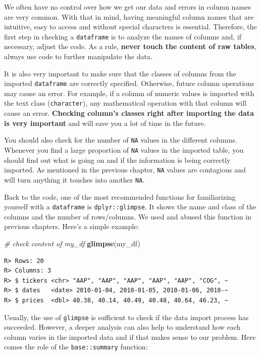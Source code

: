 \documentclass[
  12pt,
]{book}
\newenvironment{Shaded}{\begin{snugshade}}{\end{snugshade}}
\newcommand{\CommentTok}[1]{\textcolor[rgb]{0.37,0.37,0.37}{\textit{#1}}}
\newcommand{\KeywordTok}[1]{\textcolor[rgb]{0.27,0.27,0.27}{\textbf{#1}}}
\newcommand{\NormalTok}[1]{#1}
\begin{document}
We often have no control over how we get our data and errors in column names are very common. With that in mind, having meaningful column names that are intuitive, easy to access and without special characters is essential. Therefore, the first step in checking a \texttt{dataframe} is to analyze the names of columns and, if necessary, adjust the code. As a rule, \textbf{never touch the content of raw tables}, always use code to further manipulate the data.

It is also very important to make sure that the classes of columns from the imported \texttt{dataframe} are correctly specified. Otherwise, future column operations may cause an error. For example, if a column of numeric values is imported with the text class (\texttt{character}), any mathematical operation with that column will cause an error. \textbf{Checking column's classes right after importing the data is very important} and will save you a lot of time in the future.

You should also check for the number of \texttt{NA} values in the different columns. Whenever you find a large proportion of \texttt{NA} values in the imported table, you should find out what is going on and if the information is being correctly imported. As mentioned in the previous chapter, \texttt{NA} values are contagious and will turn anything it touches into another \texttt{NA}.

Back to the code, one of the most recommended functions for familiarizing yourself with a \texttt{dataframe} is \texttt{dplyr::glimpse}. It shows the name and class of the columns and the number of rows/columns. We used and abused this function in previous chapters. Here's a simple example:

\begin{Shaded}
\begin{Highlighting}[]
\CommentTok{# check content of my_df}
\KeywordTok{glimpse}\NormalTok{(my_df)}
\end{Highlighting}
\end{Shaded}

\begin{verbatim}
R> Rows: 20
R> Columns: 3
R> $ tickers <chr> "AAP", "AAP", "AAP", "AAP", "AAP", "COG", ~
R> $ dates   <date> 2010-01-04, 2010-01-05, 2010-01-06, 2010-~
R> $ prices  <dbl> 40.38, 40.14, 40.49, 40.48, 40.64, 46.23, ~
\end{verbatim}

Usually, the use of \texttt{glimpse} is sufficient to check if the data import process has succeeded. However, a deeper analysis can also help to understand how each column varies in the imported data and if that makes sense to our problem. Here comes the role of the \texttt{base::summary} function:
\end{document}
